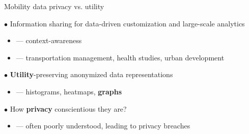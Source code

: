 \documentclass[hyperref={colorlinks = true},unknownkeysallowed]{beamer}
\begin{document}
\begin{frame}{ Mobility data privacy vs. utility}
	\vspace*{2.25mm}
\begin{block}{ $\bullet$ Information sharing for data-driven customization and large-scale analytics}
	\begin{itemize}
		  \setlength\itemsep{.3em}
		\item --- context-awareness
		\item --- transportation management, health studies, urban development
	\end{itemize}
\end{block}
\pause
\begin{block}{ $\bullet$ \textbf{Utility}-preserving anonymized data representations}
	\begin{itemize}
		  \setlength\itemsep{.3em}
	\item --- histograms, heatmaps, \textbf{graphs}
	\end{itemize}
\end{block}
\pause
\begin{block}{ $\bullet$ How \textbf{privacy} conscientious they are?}
	\begin{itemize}
		\item --- often poorly understood, leading to privacy breaches
	\end{itemize}
\end{block}
\end{frame}
\end{document}

